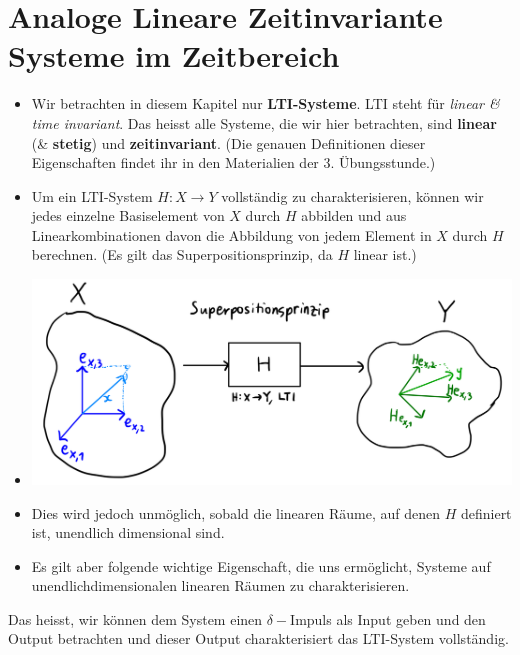 \documentclass[11pt]{article}
\begin{document}
\section*{Analoge Lineare Zeitinvariante Systeme im Zeitbereich}
\vspace*{-0.5cm}
\begin{itemize}[leftmargin=0pt]
    \item[] Wir betrachten in diesem Kapitel nur \textbf{LTI-Systeme}. LTI steht für \textit{linear \& time invariant}. Das heisst alle Systeme, die wir hier betrachten, sind \textbf{linear} (\& \textbf{stetig}) und \textbf{zeitinvariant}. (Die genauen Definitionen dieser Eigenschaften findet ihr in den Materialien der 3. Übungsstunde.) 
    \item[] Um ein LTI-System $H: X \to Y$ vollständig zu charakterisieren, können wir jedes einzelne Basiselement von $X$ durch $H$ abbilden und aus Linearkombinationen davon die Abbildung von jedem Element in $X$ durch $H$ berechnen. (Es gilt das Superpositionsprinzip, da $H$ linear ist.) 
    \item[] \begin{center}
        \includegraphics[width=0.8\linewidth]{docimgs/Superposition.jpeg}
    \end{center}
    \item[] Dies wird jedoch unmöglich, sobald die linearen Räume, auf denen $H$ definiert ist, unendlich dimensional sind.
    \item[] Es gilt aber folgende wichtige Eigenschaft, die uns ermöglicht, Systeme auf unendlichdimensionalen linearen Räumen zu charakterisieren.
\end{itemize}
\vspace*{-0.5cm}
%

Das heisst, wir können dem System einen $\delta-$Impuls als Input geben und den Output betrachten und dieser Output charakterisiert das LTI-System vollständig.
\end{document}
